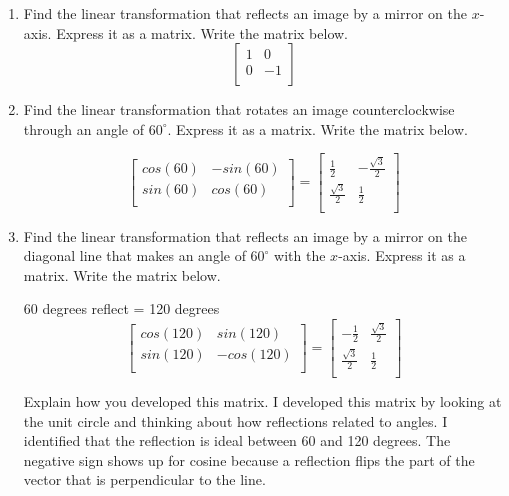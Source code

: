 \documentclass{ximera}
\begin{document}
\begin{enumerate}
    \item Find the linear transformation that reflects an image by a mirror on the $x$-axis.  Express it as a matrix.  Write the matrix below.
\[
\begin{bmatrix}
1 & 0 \\
0 & -1 \\
\end{bmatrix}
\]

\item Find the linear transformation that rotates an image counterclockwise through an angle of $60^{\circ}$.  Express it as a matrix.  Write the matrix below.

\[
\begin{bmatrix}
cos(60) & -sin(60) \\
sin(60) & cos(60) \\
\end{bmatrix}=
\begin{bmatrix}
\frac{1}{2} & -\frac{\sqrt{3}}{2} \\
\frac{\sqrt{3}}{2} & \frac{1}{2} \\
\end{bmatrix}
\]

\item Find the linear transformation that reflects an image by a mirror on the diagonal line that makes an angle of $60^{\circ}$ with the $x$-axis.  Express it as a matrix.  Write the matrix below.

60 degrees reflect = 120 degrees
\[
\begin{bmatrix}
cos(120) & sin(120) \\
sin(120) & -cos(120) \\
\end{bmatrix}=
\begin{bmatrix}
-\frac{1}{2} & \frac{\sqrt{3}}{2} \\
\frac{\sqrt{3}}{2} & \frac{1}{2} \\
\end{bmatrix}
\]

\noindent Explain how you developed this matrix.
I developed this matrix by looking at the unit circle and thinking about how reflections related to angles. I identified that the reflection is ideal between 60 and 120 degrees. The negative sign shows up for cosine because a reflection flips the part of the vector that is perpendicular to the line.

\end{enumerate}
\end{document}
